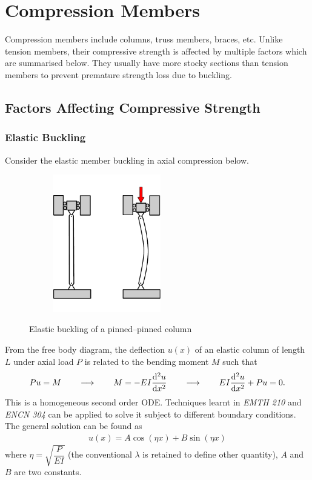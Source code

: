 \chapter{Compression Members}
Compression members include columns, truss members, braces, etc. Unlike tension members, their compressive strength is affected by multiple factors which are summarised below. They usually have more stocky sections than tension members to prevent premature strength loss due to buckling.
\begin{figure}[H]
\centering
\end{figure}
\section{Factors Affecting Compressive Strength}
\subsection{Elastic Buckling}
Consider the elastic member buckling in axial compression below.
\begin{figure}[H]
\centering\footnotesize
\begin{subfigure}[b]{.49\linewidth}
\centering
\includegraphics[height=6cm]{PIC/CH04/BUCKLING}
\end{subfigure}
\begin{subfigure}[b]{.49\linewidth}
\centering
\end{subfigure}
\caption{Elastic buckling of a pinned--pinned column}
\end{figure}

From the free body diagram, the deflection $u(x)$ of an elastic column of length $L$ under axial load $P$ is related to the bending moment $M$ such that
\begin{gather*}
Pu=M\qquad\longrightarrow\qquad{}M=-EI\dfrac{\mathrm{d}^2u}{\mathrm{d}x^2}\qquad\longrightarrow\qquad{}EI\dfrac{\mathrm{d}^2u}{\mathrm{d}x^2}+Pu=0.
\end{gather*}
This is a homogeneous second order ODE. Techniques learnt in \textit{EMTH 210} and \textit{ENCN 304} can be applied to solve it subject to different boundary conditions. The general solution can be found as
\begin{gather*}
u(x)=A\cos\left(\eta{}x\right)+B\sin\left(\eta{}x\right)
\end{gather*}
where $\eta=\sqrt{\dfrac{P}{EI}}$ (the conventional $\lambda$ is retained to define other quantity), $A$ and $B$ are two constants.

